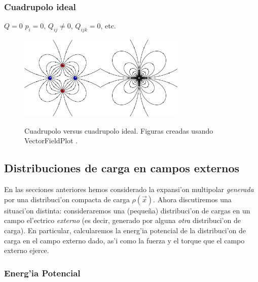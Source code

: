 \subsubsection{Cuadrupolo ideal}
$Q=0$ $p_i=0$, $Q_{ij}\neq 0$, $Q_{ijk}=0$, etc.

\begin{figure}[H]
\begin{center}
\includegraphics[height=4cm]{fig/fig-E-03.pdf}\hspace{1cm}\includegraphics[height=4cm]{fig/fig-campo-cuadrupolo-electrico-ideal.pdf} 
\caption{Cuadrupolo versus cuadrupolo ideal. Figuras creadas usando VectorFieldPlot \cite{VFP}.}
\label{fig-dipolos}
\end{center}
\end{figure}
\newpage


\subsection{Distribuciones de carga en campos externos} \label{ed3_3}

En las secciones anteriores hemos considerado la expansi'on multipolar
\textit{generada} por una distribuci'on compacta de carga
$\rho(\vec{x})$. Ahora discutiremos una situaci'on distinta: consideraremos
una (peque\~na) distribuci'on de cargas en un campo el'ectrico
\textit{externo} (es decir, generado por alguna \textit{otra} distribuci'on de
carga). En particular, calcularemos la energ'ia potencial de la
distribuci'on de carga en el campo externo dado, as'i como la fuerza y el
torque que el campo externo ejerce.

\subsubsection{Energ'ia Potencial} \label{ed3_3_1}


